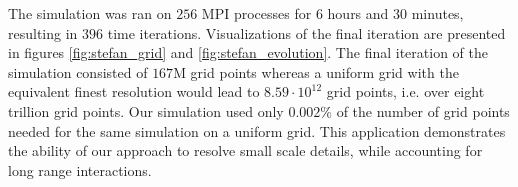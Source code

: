 The simulation was ran on $256$ MPI processes for $6$ hours and $30$ minutes, resulting in $396$ time iterations. Visualizations of the final iteration are presented in figures \ref{fig:stefan_grid} and \ref{fig:stefan_evolution}. The final iteration of the simulation consisted of $167$M grid points whereas a uniform grid with the equivalent finest resolution would lead to $8.59\cdot10^{12}$ grid points, i.e. over eight trillion grid points. Our simulation used only $0.002\%$ of the number of grid points needed for the same simulation on a uniform grid. This application demonstrates the ability of our approach to resolve small scale details, while accounting for long range interactions.

\begin{figure}[ht!]
\begin{center}

\end{center}
\end{figure}
